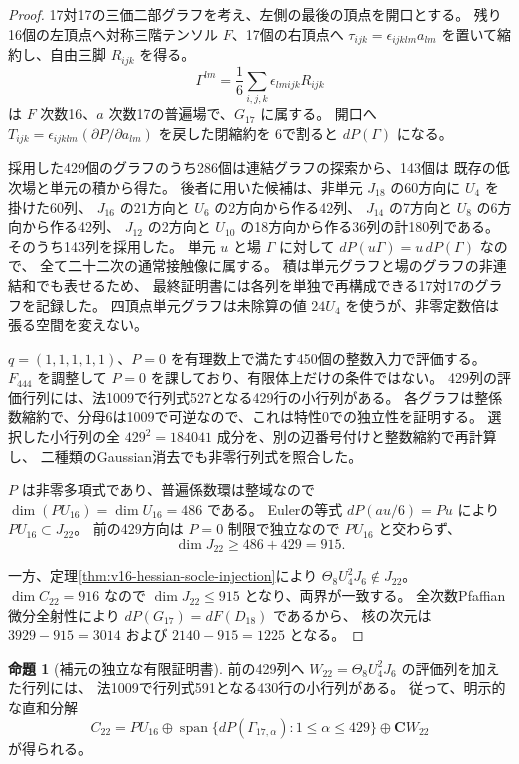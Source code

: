 \documentclass[a4paper,11pt]{ltjsarticle}
\theoremstyle{definition}
\newtheorem{proposition}[theorem]{命題}
\begin{document}
\begin{proof}
17対17の三価二部グラフを考え、左側の最後の頂点を開口とする。
残り16個の左頂点へ対称三階テンソル $F$、17個の右頂点へ
$\tau_{ijk}=\epsilon_{ijklm}a_{lm}$ を置いて縮約し、自由三脚 $R_{ijk}$ を得る。
\[
 \Gamma^{lm}=\frac16\sum_{i,j,k}\epsilon_{lmijk}R_{ijk}
\]
は $F$ 次数16、$a$ 次数17の普遍場で、$G_{17}$ に属する。
開口へ $T_{ijk}=\epsilon_{ijklm}(\partial P/\partial a_{lm})$ を戻した閉縮約を
6で割ると $dP(\Gamma)$ になる。

採用した429個のグラフのうち286個は連結グラフの探索から、143個は
既存の低次場と単元の積から得た。
後者に用いた候補は、非単元 $J_{18}$ の60方向に $U_4$ を掛けた60列、
$J_{16}$ の21方向と $U_6$ の2方向から作る42列、
$J_{14}$ の7方向と $U_8$ の6方向から作る42列、
$J_{12}$ の2方向と $U_{10}$ の18方向から作る36列の計180列である。
そのうち143列を採用した。
単元 $u$ と場 $\Gamma$ に対して $dP(u\Gamma)=u\,dP(\Gamma)$ なので、
全て二十二次の通常接触像に属する。
積は単元グラフと場のグラフの非連結和でも表せるため、
最終証明書には各列を単独で再構成できる17対17のグラフを記録した。
四頂点単元グラフは未除算の値 $24U_4$ を使うが、非零定数倍は張る空間を変えない。

$q=(1,1,1,1,1)$、$P=0$ を有理数上で満たす450個の整数入力で評価する。
$F_{444}$ を調整して $P=0$ を課しており、有限体上だけの条件ではない。
429列の評価行列には、法1009で行列式527となる429行の小行列がある。
各グラフは整係数縮約で、分母6は1009で可逆なので、これは特性0での独立性を証明する。
選択した小行列の全 $429^2=184041$ 成分を、別の辺番号付けと整数縮約で再計算し、
二種類のGaussian消去でも非零行列式を照合した。

$P$ は非零多項式であり、普遍係数環は整域なので
$\dim(PU_{16})=\dim U_{16}=486$ である。
Eulerの等式 $dP(au/6)=Pu$ により $PU_{16}\subset J_{22}$。
前の429方向は $P=0$ 制限で独立なので $PU_{16}$ と交わらず、
\[
 \dim J_{22}\geq486+429=915.
\]

一方、定理\ref{thm:v16-hessian-socle-injection}により
$\Theta_8U_4^2J_6\notin J_{22}$。
$\dim C_{22}=916$ なので $\dim J_{22}\leq915$ となり、両界が一致する。
全次数Pfaffian微分全射性により $dP(G_{17})=dF(D_{18})$ であるから、
核の次元は $3929-915=3014$ および $2140-915=1225$ となる。
\end{proof}

\begin{proposition}[補元の独立な有限証明書]
\label{prop:v16-twenty-second-complement}
前の429列へ $W_{22}=\Theta_8U_4^2J_6$ の評価列を加えた行列には、
法1009で行列式591となる430行の小行列がある。
従って、明示的な直和分解
\[
 C_{22}=P U_{16}\oplus
 \operatorname{span}\{dP(\Gamma_{17,\alpha}):1\leq\alpha\leq429\}
 \oplus\mathbf C W_{22}
\]
が得られる。
\end{proposition}
\end{document}
